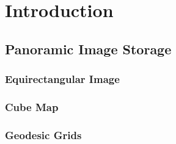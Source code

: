 

\chapter{Introduction}



\section{Panoramic Image Storage}

\subsection{Equirectangular Image}


\subsection{Cube Map}


\subsection{Geodesic Grids}
